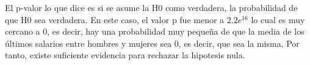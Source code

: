 \documentclass[
]{article}
\begin{document}
El p-valor lo que dice es si se asume la H0 como verdadera, la
probabilidad de que H0 sea verdadera. En este caso, el valor p fue menor
a \(2.2e^{16}\) lo cual es muy cercano a 0, es decir, hay una
probabilidad muy pequeña de que la media de los últimos salarios entre
hombres y mujeres sea 0, es decir, que sea la misma. Por tanto, existe
suficiente evidencia para rechazar la hipotesis nula.
\end{document}
